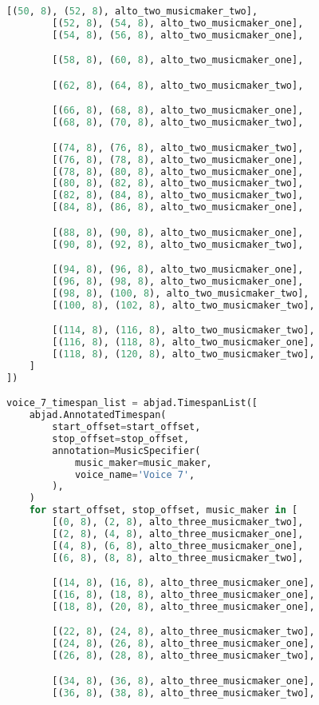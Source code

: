 \begin{lstlisting}[language=Python, caption=Invocation Source Code]
        [(50, 8), (52, 8), alto_two_musicmaker_two],
        [(52, 8), (54, 8), alto_two_musicmaker_one],
        [(54, 8), (56, 8), alto_two_musicmaker_one],

        [(58, 8), (60, 8), alto_two_musicmaker_one],

        [(62, 8), (64, 8), alto_two_musicmaker_two],

        [(66, 8), (68, 8), alto_two_musicmaker_one],
        [(68, 8), (70, 8), alto_two_musicmaker_two],

        [(74, 8), (76, 8), alto_two_musicmaker_two],
        [(76, 8), (78, 8), alto_two_musicmaker_one],
        [(78, 8), (80, 8), alto_two_musicmaker_one],
        [(80, 8), (82, 8), alto_two_musicmaker_two],
        [(82, 8), (84, 8), alto_two_musicmaker_two],
        [(84, 8), (86, 8), alto_two_musicmaker_one],

        [(88, 8), (90, 8), alto_two_musicmaker_one],
        [(90, 8), (92, 8), alto_two_musicmaker_two],

        [(94, 8), (96, 8), alto_two_musicmaker_one],
        [(96, 8), (98, 8), alto_two_musicmaker_one],
        [(98, 8), (100, 8), alto_two_musicmaker_two],
        [(100, 8), (102, 8), alto_two_musicmaker_two],

        [(114, 8), (116, 8), alto_two_musicmaker_two],
        [(116, 8), (118, 8), alto_two_musicmaker_one],
        [(118, 8), (120, 8), alto_two_musicmaker_two],
    ]
])

voice_7_timespan_list = abjad.TimespanList([
    abjad.AnnotatedTimespan(
        start_offset=start_offset,
        stop_offset=stop_offset,
        annotation=MusicSpecifier(
            music_maker=music_maker,
            voice_name='Voice 7',
        ),
    )
    for start_offset, stop_offset, music_maker in [
        [(0, 8), (2, 8), alto_three_musicmaker_two],
        [(2, 8), (4, 8), alto_three_musicmaker_one],
        [(4, 8), (6, 8), alto_three_musicmaker_one],
        [(6, 8), (8, 8), alto_three_musicmaker_two],

        [(14, 8), (16, 8), alto_three_musicmaker_one],
        [(16, 8), (18, 8), alto_three_musicmaker_one],
        [(18, 8), (20, 8), alto_three_musicmaker_one],

        [(22, 8), (24, 8), alto_three_musicmaker_two],
        [(24, 8), (26, 8), alto_three_musicmaker_one],
        [(26, 8), (28, 8), alto_three_musicmaker_two],

        [(34, 8), (36, 8), alto_three_musicmaker_one],
        [(36, 8), (38, 8), alto_three_musicmaker_two],


\end{lstlisting}
